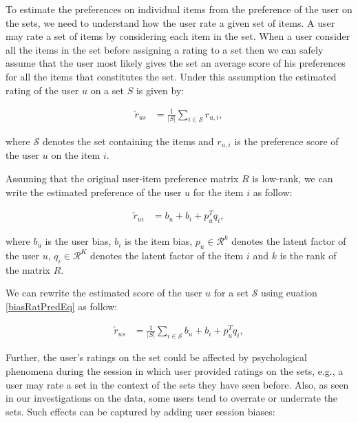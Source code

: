 
To estimate the preferences on individual items from the preference of the user on the
sets, we need to understand how the user rate a given set of items. A user may
rate a set of items by considering each item in the set. When a user consider all the 
items in the set before 
assigning a rating to a set then we can safely assume that the user most likely
gives the set an average score of his preferences for all the items that constitutes 
the set. Under this assumption the estimated rating of the user $u$ on a 
set $S$ is given by: 

\begin{equation} \label{avgSetEq}
  \begin{split}
    \tilde{r}_{us} &= \frac{1}{|S|} \sum_{i \in \mathcal{S}} r_{u,i},
  \end{split}
\end{equation}

\noindent where $\mathcal{S}$ denotes the set containing the items and $r_{u,i}$ is the
preference score of the user $u$ on the item $i$.


Assuming that the original user-item preference matrix $R$ is low-rank, we can write
the estimated preference of the user $u$ for the item $i$ as follow:

\begin{equation} \label{biasRatPredEq}
  \begin{split}
    \tilde{r}_{ui} &= b_u + b_i + p_u^Tq_i, 
  \end{split}
\end{equation}


\noindent where $b_u$ is the user bias, $b_i$ is the item bias, $p_u \in \mathcal{R}^k$ denotes the latent factor of the user
$u$, $q_i \in \mathcal{R}^K$ denotes the latent factor of the item $i$ and $k$ 
is the rank of the matrix $R$.  

We can rewrite the estimated score of the 
user $u$ for a set $\mathcal{S}$ using euation \ref{biasRatPredEq} as follow:

\begin{equation} \label{avgSetLoEq}
  \begin{split}
    \tilde{r}_{us} &= \frac{1}{|S|} \sum_{i \in \mathcal{S}} b_u + b_i + p_u^Tq_i,
  \end{split}
\end{equation}

Further, the user's ratings on the set could be affected by psychological
phenomena during the session in which user provided ratings on the sets, e.g., a user may
rate a set in the context of the sets they have seen before. Also, as seen in our
investigations on the data, some users tend to overrate or underrate the sets.
Such effects can be captured by adding user session biases:

